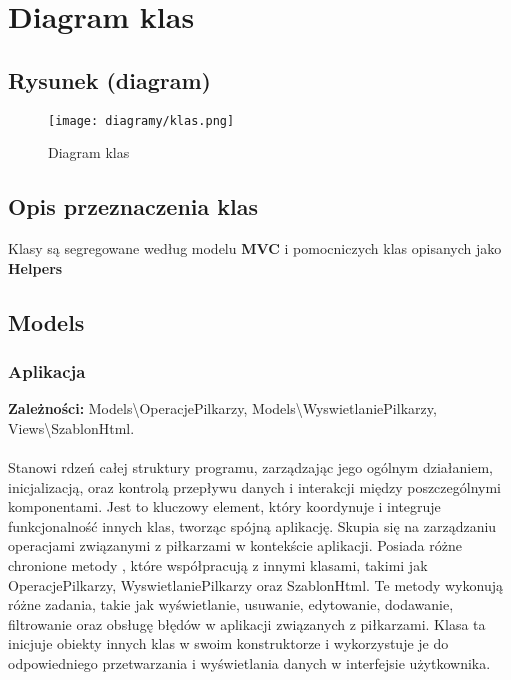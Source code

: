 \section{Diagram klas}

\subsection{Rysunek (diagram)}
\begin{figure}[!htb]
    \centering
    \texttt{[image: diagramy/klas.png]}
    \caption{Diagram klas}                
\end{figure}

\subsection{Opis przeznaczenia klas}
    Klasy są segregowane według modelu \textbf{MVC} i pomocniczych klas opisanych jako \textbf{Helpers}

\subsection{Models}
    \subsubsection{Aplikacja}

    \textbf{Zależności: } 
    Models\textbackslash{}OperacjePilkarzy, 
    Models\textbackslash{}WyswietlaniePilkarzy, 
    Views\textbackslash{}SzablonHtml.\\\\
    
    Stanowi rdzeń całej struktury programu, zarządzając jego ogólnym działaniem, inicjalizacją, oraz kontrolą przepływu danych i interakcji między poszczególnymi komponentami. Jest to kluczowy element, który koordynuje i integruje funkcjonalność innych klas, tworząc spójną aplikację.
    Skupia się na zarządzaniu operacjami związanymi z piłkarzami w kontekście aplikacji. Posiada różne chronione metody , które współpracują z innymi klasami, takimi jak OperacjePilkarzy, WyswietlaniePilkarzy oraz SzablonHtml. Te metody wykonują różne zadania, takie jak wyświetlanie, usuwanie, edytowanie, dodawanie, filtrowanie oraz obsługę błędów w aplikacji związanych z piłkarzami. Klasa ta inicjuje obiekty innych klas w swoim konstruktorze i wykorzystuje je do odpowiedniego przetwarzania i wyświetlania danych w interfejsie użytkownika.\\

